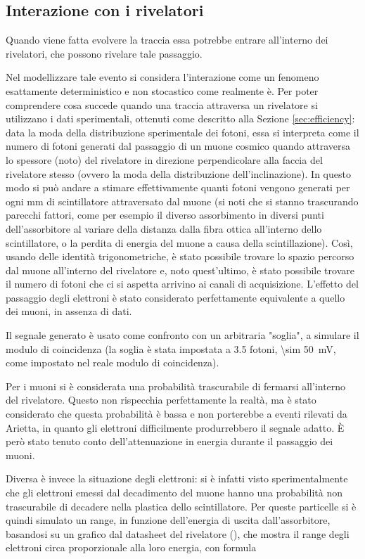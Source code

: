 \subsection{Interazione con i rivelatori}
Quando viene fatta evolvere la traccia essa potrebbe entrare all'interno dei rivelatori, che possono rivelare tale passaggio. 

Nel modellizzare tale evento si considera l'interazione come un fenomeno esattamente deterministico e non stocastico come realmente è. 
Per poter comprendere cosa succede quando una traccia attraversa un rivelatore si utilizzano i dati sperimentali, ottenuti come descritto alla Sezione \ref{sec:efficiency}: data la moda della distribuzione sperimentale dei fotoni, essa si interpreta come il numero di fotoni generati dal passaggio di un muone cosmico quando attraversa lo spessore (noto) del rivelatore in direzione perpendicolare alla faccia del rivelatore stesso (ovvero la moda della distribuzione dell'inclinazione). 
In questo modo si può andare a stimare effettivamente quanti fotoni vengono generati per ogni mm di scintillatore attraversato dal muone (si noti che si stanno trascurando parecchi fattori, come per esempio il diverso assorbimento in diversi punti dell'assorbitore al variare della distanza dalla fibra ottica all'interno dello scintillatore, o la perdita di energia del muone a causa della scintillazione). 
Così, usando delle identità trigonometriche, è stato possibile trovare lo spazio percorso dal muone all'interno del rivelatore e, noto quest'ultimo, è stato possibile trovare il numero di fotoni che ci si aspetta arrivino ai canali di acquisizione. 
L'effetto del passaggio degli elettroni \`e stato considerato perfettamente equivalente a quello dei muoni, in assenza di dati.

Il segnale generato \`e usato come confronto con un arbitraria "soglia", a simulare il modulo di coincidenza (la soglia \`e stata impostata a 3.5 fotoni, \SI{\sim 50}{\mV}, come impostato nel reale modulo di coincidenza).

Per i muoni si \`e considerata una probabilit\`a trascurabile di fermarsi all'interno del rivelatore. Questo non rispecchia perfettamente la realt\`a, ma \`e stato considerato che questa probabilit\`a \`e bassa e  non porterebbe a eventi rilevati da Arietta, in quanto gli elettroni difficilmente produrrebbero il segnale adatto. \`E per\`o stato tenuto conto dell'attenuazione in energia durante il passaggio dei muoni.

Diversa \`e invece la situazione degli elettroni: si \`e infatti visto sperimentalmente che gli elettroni emessi dal decadimento del muone hanno una probabilit\`a non trascurabile di decadere nella plastica dello scintillatore. Per queste particelle si \`e quindi simulato un range, in funzione dell'energia di uscita dall'assorbitore, basandosi su un grafico dal datasheet del rivelatore (\cite{bib:SiPM}), che mostra il range degli elettroni circa proporzionale alla loro energia, con formula


